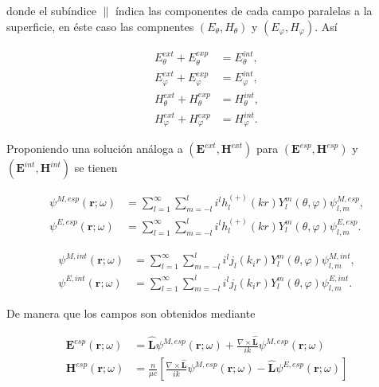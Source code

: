 \documentclass[a4paper,10pt]{article}
\newcommand{\hatbf}[1] {\hat{\mathbf{#1}}}	%
\begin{document}
donde el subíndice $\|$ índica las componentes de cada campo paralelas a la superficie, en éste caso las compnentes $(E_{\theta},H_{\theta})$ y $(E_{\varphi},H_{\varphi})$. Así

\begin{subequations}
\begin{align}
E_{\theta}^{ext}+E_{\theta}^{exp}&=E_{\theta}^{int},	\\
E_{\varphi}^{ext}+E_{\varphi}^{exp}&=E_{\varphi}^{int},	\\
H_{\theta}^{ext}+H_{\theta}^{exp}&=H_{\theta}^{int},	\\
H_{\varphi}^{ext}+H_{\varphi}^{exp}&=H_{\varphi}^{int}.
\end{align}
\label{Eq6.2}
\end{subequations}

Proponiendo una solución análoga a $(\textbf{E}^{ext},\textbf{H}^{ext})$ para $(\textbf{E}^{esp},\textbf{H}^{esp})$ y $(\textbf{E}^{int},\textbf{H}^{int})$ se tienen

\begin{subequations}
\begin{align}
\psi^{M,esp}	(\textbf{r};\omega)&=\sum_{l=1}^{\infty}\sum_{m=-l}^{l}i^l h_l^{(+)}(kr)Y_l^m(\theta,\varphi)\psi_{l,m}^{M,esp},	\label{Eq3.11a}	\\
\psi^{E,esp}(\textbf{r};\omega)	&=\sum_{l=1}^{\infty}\sum_{m=-l}^{l}i^l h_l^{(+)}(kr)Y_l^m(\theta,\varphi)\psi_{l,m}^{E,esp}.	\label{Eq3.11b}
\end{align}
\end{subequations}

\begin{subequations}
\begin{align}
\psi^{M,int}(\textbf{r};\omega)	&=\sum_{l=1}^{\infty}\sum_{m=-l}^{l}i^l j_l(k_ir)Y_l^m(\theta,\varphi)\psi_{l,m}^{M,int},	\label{Eq3.11a}	\\
\psi^{E,int}(\textbf{r};\omega)	&=\sum_{l=1}^{\infty}\sum_{m=-l}^{l}i^l j_l(k_ir)Y_l^m(\theta,\varphi)\psi_{l,m}^{E,int}.	\label{Eq3.11b}
\end{align}
\end{subequations}

De manera que los campos son obtenidos mediante

\begin{subequations}
\begin{align}
\textbf{E}^{esp}(\textbf{r};\omega)&=\hatbf{L}\psi^{M,esp}(\textbf{r};\omega)+\frac{\nabla\times\hatbf{L}}{ik}\psi^{M,esp}(\textbf{r};\omega)	\\
\textbf{H}^{esp}(\textbf{r};\omega)&=\frac{n}{\mu c}\left[\frac{\nabla\times\hatbf{L}}{ik}\psi^{M,esp}(\textbf{r};\omega)-\hatbf{L}\psi^{E,esp}(\textbf{r};\omega)\right]
\end{align}
\end{subequations}
\end{document}
